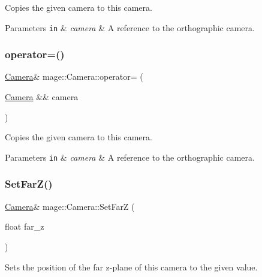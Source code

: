 Copies the given camera to this camera.


\begin{DoxyParams}[1]{Parameters}
\mbox{\tt in}  & {\em camera} & A reference to the orthographic camera. \\
\hline
\end{DoxyParams}
\hypertarget{classmage_1_1_camera_a481f758a59564bb4074249f9bbf4e305}{}\label{classmage_1_1_camera_a481f758a59564bb4074249f9bbf4e305} 
\subsubsection{\texorpdfstring{operator=()}{operator=()}\hspace{0.1cm}{\footnotesize\ttfamily [2/2]}}
{\footnotesize\ttfamily \hyperlink{classmage_1_1_camera}{Camera}\& mage\+::\+Camera\+::operator= (\begin{DoxyParamCaption}\item[{\hyperlink{classmage_1_1_camera}{Camera} \&\&}]{camera }\end{DoxyParamCaption})\hspace{0.3cm}{\ttfamily [default]}}

Copies the given camera to this camera.


\begin{DoxyParams}[1]{Parameters}
\mbox{\tt in}  & {\em camera} & A reference to the orthographic camera. \\
\hline
\end{DoxyParams}
\hypertarget{classmage_1_1_camera_acd1ab15368f052b846f72b92a52a94c5}{}\label{classmage_1_1_camera_acd1ab15368f052b846f72b92a52a94c5} 
\subsubsection{\texorpdfstring{Set\+Far\+Z()}{SetFarZ()}}
{\footnotesize\ttfamily \hyperlink{classmage_1_1_camera}{Camera}\& mage\+::\+Camera\+::\+Set\+FarZ (\begin{DoxyParamCaption}\item[{float}]{far\+\_\+z }\end{DoxyParamCaption})}

Sets the position of the far z-\/plane of this camera to the given value.


